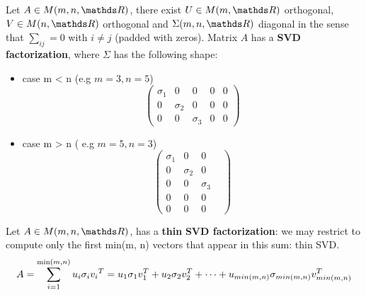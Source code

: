 \documentclass[computational_mathematics.tex]{subfiles}
\begin{document}
\begin{definition}
  Let $A \in M(m, n, \R)$, there exist $U \in M(m, \R)$ orthogonal, $V \in M(n, \R)$ orthogonal and $\Sigma(m, n, \R)$ diagonal in the sense that $\sum_{ij} = 0$ with $i \neq j$ (padded with zeros). Matrix $A$  has a \textbf{SVD factorization}, where $\Sigma$ has the following shape:
  \begin{itemize}
      \item case m < n  (e.g $m=3, n=5$)
        \[
          \begin{pmatrix}
            \sigma_1&0&0&0&0\\
            0& \sigma_2&0&0&0\\
            0&0&\sigma_3&0&0
          \end{pmatrix}
        \]
        
        \item  case m > n ( e.g $m=5, n=3$)
        \[
          \begin{pmatrix}
            \sigma_1&0&0&\\
            0& \sigma_2&0&\\
            0&0&\sigma_3&\\
            0&0&0\\
            0&0&0
          \end{pmatrix}
        \]
  \end{itemize}

\end{definition}

\begin{definition}
  Let $A \in M(m, n, \R)$,   has a \textbf{thin} \textbf{SVD factorization}:  we may restrict to compute only the first min(m, n)
vectors that appear in this sum: thin SVD.
$$A = \sum\limits_{i=1}^{\min(m, n)} u_i \sigma_i {v_i}^{T} = u_1 \sigma_1 v_1^T + u_2 \sigma_2 v_2^T + \dots + u_{min(m,n)} \sigma_{min(m,n)} v_{min(m,n)}^T $$
\end{definition}

\end{document}
